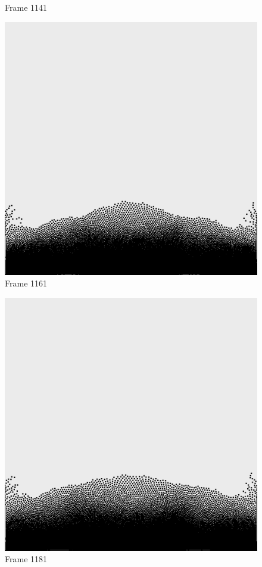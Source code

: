 \documentclass[a4paper, 12pt, oneside]{book}
\begin{document}
\begin{figure}[!ht]
\begin{center}
            Frame 1141
        \end{center}
    \endminipage
    \hfill
        \begin{center}
            \includegraphics[width=\linewidth]{images/test_case_1/1161.png}
            Frame 1161
        \end{center}
    \endminipage
    \hfill
        \begin{center}
            \includegraphics[width=\linewidth]{images/test_case_1/1181.png}
            Frame 1181
        \end{center}
    \endminipage
    \hfill
\end{figure}
\end{document}
